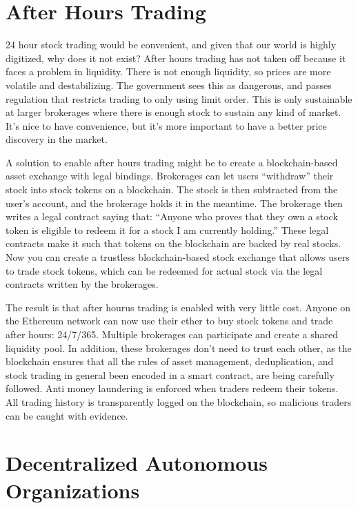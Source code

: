 \documentclass[full.tex]{subfiles}
\begin{document}
    \section*{After Hours Trading}

    24 hour stock trading would be convenient, and given that our world is highly digitized, why does it not exist? After hours trading has not taken off because it faces a problem in liquidity. There is not enough liquidity, so prices are more volatile and destabilizing. The government sees this as dangerous, and passes regulation that restricts trading to only using limit order. This is only sustainable at larger brokerages where there is enough stock to sustain any kind of market. It's nice to have convenience, but it's more important to have a better price discovery in the market. 
    
    A solution to enable after hours trading might be to create a blockchain-based asset exchange with legal bindings. Brokerages can let users ``withdraw'' their stock into stock tokens on a blockchain. The stock is then subtracted from the user's account, and the brokerage holds it in the meantime. The brokerage then writes a legal contract saying that: ``Anyone who proves that they own a stock token is eligible to redeem it for a stock I am currently holding.'' These legal contracts make it such that tokens on the blockchain are backed by real stocks. Now you can create a trustless blockchain-based stock exchange that allows users to trade stock tokens, which can be redeemed for actual stock via the legal contracts written by the brokerages.
    
    The result is that after hourus trading is enabled with very little cost. Anyone on the Ethereum network can now use their ether to buy stock tokens and trade after hours: 24/7/365. Multiple brokerages can participate and create a shared liquidity pool. In addition, these brokerages don't need to trust each other, as the blockchain ensures that all the rules of asset management, deduplication, and stock trading in general been encoded in a smart contract, are being carefully followed. Anti money laundering is enforced when traders redeem their tokens. All trading history is transparently logged on the blockchain, so malicious traders can be caught with evidence.
    
    \section*{Decentralized Autonomous Organizations}
    
\end{document}
